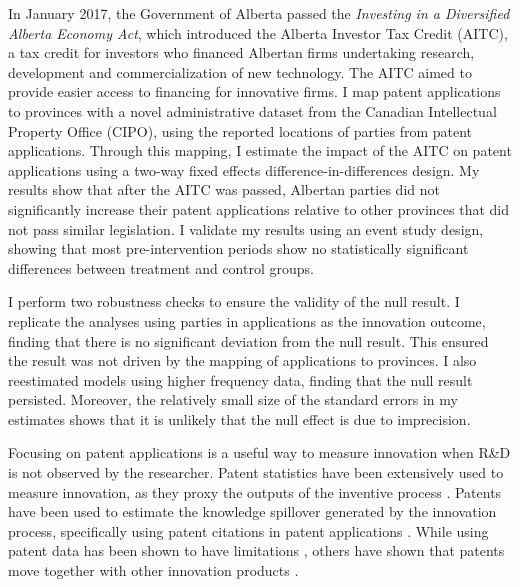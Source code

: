 \documentclass[../main.tex]{subfiles}
\begin{document}
In January 2017, the Government of Alberta passed the \textit{Investing in a Diversified Alberta Economy Act}, which introduced the Alberta Investor Tax Credit (AITC), a tax credit for investors who financed Albertan firms undertaking research, development and commercialization of new technology. The AITC aimed to provide easier access to financing for innovative firms. I map patent applications to provinces with a novel administrative dataset from the Canadian Intellectual Property Office (CIPO), using the reported locations of parties from patent applications. Through this mapping, I estimate the impact of the AITC on patent applications using a two-way fixed effects difference-in-differences design. My results show that after the AITC was passed, Albertan parties did not significantly increase their patent applications relative to other provinces that did not pass similar legislation. I validate my results using an event study design, showing that most pre-intervention periods show no statistically significant differences between treatment and control groups. 

I perform two robustness checks to ensure the validity of the null result. I replicate the analyses using parties in applications as the innovation outcome, finding that there is no significant deviation from the null result. This ensured the result was not driven by the mapping of applications to provinces. I also reestimated models using higher frequency data, finding that the null result persisted. Moreover, the relatively small size of the standard errors in my estimates shows that it is unlikely that the null effect is due to imprecision.

Focusing on patent applications is a useful way to measure innovation when R\&D is not observed by the researcher. Patent statistics have been extensively used to measure innovation, as they proxy the outputs of the inventive process \parencite{nordhaus69, pavitt85,trajtenberg90,artz_etal10}. Patents have been used to estimate the knowledge spillover generated by the innovation process, specifically using patent citations in patent applications \parencite{trajtenberg90,jaffe_etal93}. While using patent data has been shown to have limitations \parencite{lanjouw_etal98a}, others have shown that patents move together with other innovation products \parencite{lanjouw_schankerman04}.
\end{document}
